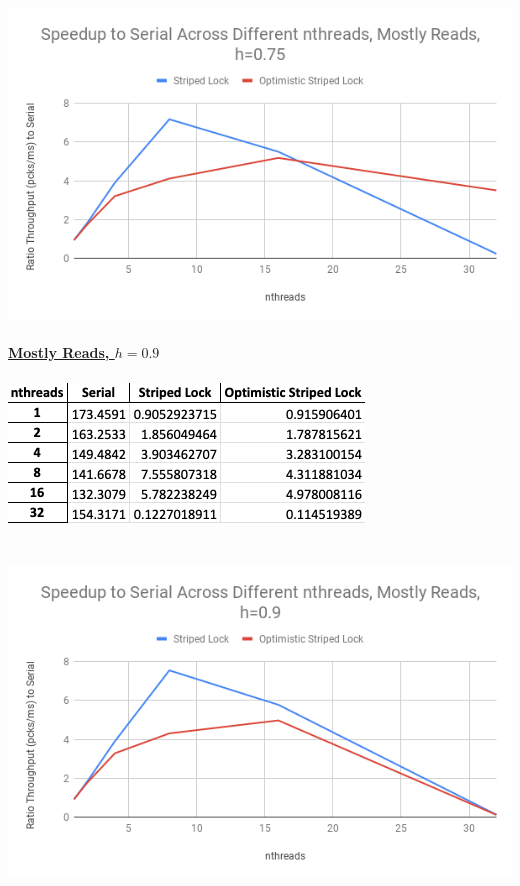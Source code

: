 \documentclass{article}
\begin{document}
\begin{adjustwidth}{-2cm}{-2cm}
\null\\
\includegraphics[width=\linewidth]{e3_09_75_graph.png}\\ \null\\
\underline{\textbf{Mostly Reads, $h=0.9$}}\\
\null\\
\includegraphics[width=\linewidth]{e3_09_9_data.png}\\ \null\\
\null\\
\includegraphics[width=\linewidth]{e3_09_9_graph.png}\\ \null\\

\end{adjustwidth}
\end{document}
